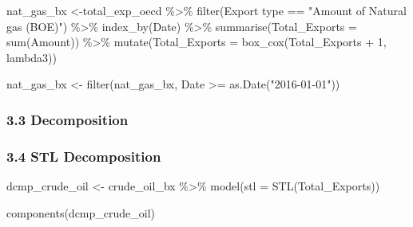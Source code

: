 \documentclass[
]{article}
\newenvironment{Shaded}{\begin{snugshade}}{\end{snugshade}}
\newcommand{\AttributeTok}[1]{\textcolor[rgb]{0.77,0.63,0.00}{#1}}
\newcommand{\DecValTok}[1]{\textcolor[rgb]{0.00,0.00,0.81}{#1}}
\newcommand{\FunctionTok}[1]{\textcolor[rgb]{0.00,0.00,0.00}{#1}}
\newcommand{\NormalTok}[1]{#1}
\newcommand{\OtherTok}[1]{\textcolor[rgb]{0.56,0.35,0.01}{#1}}
\newcommand{\SpecialCharTok}[1]{\textcolor[rgb]{0.00,0.00,0.00}{#1}}
\newcommand{\StringTok}[1]{\textcolor[rgb]{0.31,0.60,0.02}{#1}}
\begin{document}
\begin{Shaded}
\begin{Highlighting}[]
\NormalTok{nat\_gas\_bx }\OtherTok{\textless{}{-}}\NormalTok{total\_exp\_oecd }\SpecialCharTok{\%\textgreater{}\%} 
  \FunctionTok{filter}\NormalTok{(}\StringTok{\textasciigrave{}}\AttributeTok{Export type}\StringTok{\textasciigrave{}} \SpecialCharTok{==} \StringTok{"Amount of Natural gas (BOE)"}\NormalTok{) }\SpecialCharTok{\%\textgreater{}\%} 
  \FunctionTok{index\_by}\NormalTok{(Date) }\SpecialCharTok{\%\textgreater{}\%} 
  \FunctionTok{summarise}\NormalTok{(}\AttributeTok{Total\_Exports =} \FunctionTok{sum}\NormalTok{(Amount)) }\SpecialCharTok{\%\textgreater{}\%} 
  \FunctionTok{mutate}\NormalTok{(}\AttributeTok{Total\_Exports =} \FunctionTok{box\_cox}\NormalTok{(Total\_Exports }\SpecialCharTok{+} \DecValTok{1}\NormalTok{, lambda3))}

\NormalTok{nat\_gas\_bx }\OtherTok{\textless{}{-}} \FunctionTok{filter}\NormalTok{(nat\_gas\_bx, Date }\SpecialCharTok{\textgreater{}=} \FunctionTok{as.Date}\NormalTok{(}\StringTok{"2016{-}01{-}01"}\NormalTok{))}
\end{Highlighting}
\end{Shaded}

\hypertarget{decomposition}{%
\subsubsection{3.3 Decomposition}\label{decomposition}}

\hypertarget{stl-decomposition}{%
\subsubsection{3.4 STL Decomposition}\label{stl-decomposition}}

\begin{Shaded}
\begin{Highlighting}[]
\NormalTok{dcmp\_crude\_oil }\OtherTok{\textless{}{-}}\NormalTok{ crude\_oil\_bx }\SpecialCharTok{\%\textgreater{}\%}
  \FunctionTok{model}\NormalTok{(}\AttributeTok{stl =} \FunctionTok{STL}\NormalTok{(Total\_Exports))}

\FunctionTok{components}\NormalTok{(dcmp\_crude\_oil)}
\end{Highlighting}
\end{Shaded}
\end{document}
